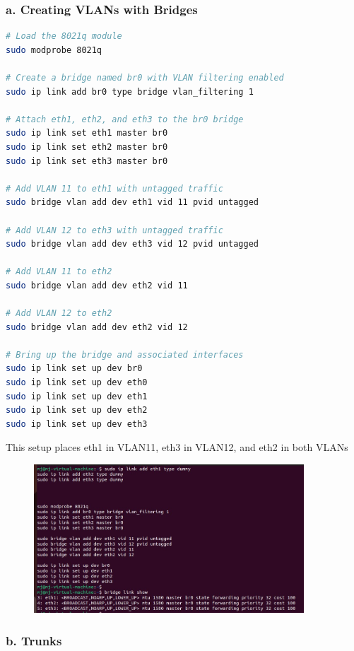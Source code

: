 \documentclass{report}
\begin{document}
\subsubsection*{a. Creating VLANs with Bridges}

\begin{lstlisting}[language=bash]
# Load the 8021q module
sudo modprobe 8021q

# Create a bridge named br0 with VLAN filtering enabled
sudo ip link add br0 type bridge vlan_filtering 1

# Attach eth1, eth2, and eth3 to the br0 bridge
sudo ip link set eth1 master br0
sudo ip link set eth2 master br0
sudo ip link set eth3 master br0

# Add VLAN 11 to eth1 with untagged traffic 
sudo bridge vlan add dev eth1 vid 11 pvid untagged

# Add VLAN 12 to eth3 with untagged traffic 
sudo bridge vlan add dev eth3 vid 12 pvid untagged

# Add VLAN 11 to eth2
sudo bridge vlan add dev eth2 vid 11

# Add VLAN 12 to eth2
sudo bridge vlan add dev eth2 vid 12

# Bring up the bridge and associated interfaces
sudo ip link set up dev br0
sudo ip link set up dev eth0
sudo ip link set up dev eth1
sudo ip link set up dev eth2
sudo ip link set up dev eth3
\end{lstlisting} 

This setup places eth1 in VLAN11, eth3 in VLAN12, and eth2 in both VLANs\cite{5}

\begin{figure}[h] 
  \centering 
  \includegraphics[width=0.9\textwidth]{19.jpg} 
\end{figure} 


\subsubsection*{b. Trunks}
\end{document}

